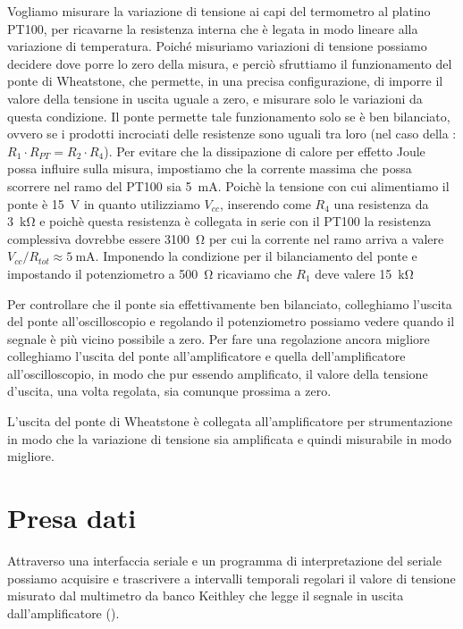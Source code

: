 \documentclass[
    rmp,
    reprint, 
    superscriptaddress, 
    altaffilletter, 
    amsmath, 
    amssymb,
    a4paper]{revtex4-2}
\begin{document}
Vogliamo misurare la variazione di tensione ai capi del termometro al platino PT100, per ricavarne la resistenza interna che è legata in modo lineare alla variazione di temperatura. Poiché misuriamo variazioni di tensione possiamo decidere dove porre lo zero della misura, e perciò sfruttiamo il funzionamento del ponte di Wheatstone, che permette, in una precisa configurazione, di imporre il valore della tensione in uscita uguale a zero, e misurare solo le variazioni da questa condizione. Il ponte permette tale funzionamento solo se è ben bilanciato, ovvero se i prodotti incrociati delle resistenze sono uguali tra loro (nel caso della : $R_1\cdot R_{PT}=R_2\cdot R_4$). Per evitare che la dissipazione di calore per effetto Joule possa influire sulla misura, impostiamo che la corrente massima che possa scorrere nel ramo del PT100 sia \SI{5}{\milli\ampere}. Poichè la tensione con cui alimentiamo il ponte è \SI{15}{\volt} in quanto utilizziamo $V_{cc}$, inserendo come $R_4$ una resistenza da \SI{3}{\kilo\ohm} e poichè questa resistenza è collegata in serie con il PT100 la resistenza complessiva dovrebbe essere \SI{3100}{\ohm} per cui la corrente nel ramo arriva a valere $V_{cc}/R_{tot}\approx\SI{5}{\milli\ampere}$. Imponendo la condizione per il bilanciamento del ponte e impostando il potenziometro a \SI{500}{\ohm} ricaviamo che $R_1$ deve valere \SI{15}{\kilo\ohm} 

Per controllare che il ponte sia effettivamente ben bilanciato, colleghiamo l'uscita del ponte all'oscilloscopio e regolando il potenziometro possiamo vedere quando il segnale è più vicino possibile a zero. Per fare una regolazione ancora migliore colleghiamo l'uscita del ponte all'amplificatore e quella dell'amplificatore all'oscilloscopio, in modo che pur essendo amplificato, il valore della tensione d'uscita, una volta regolata, sia comunque prossima a zero.

L'uscita del ponte di Wheatstone è collegata all'amplificatore per strumentazione in modo che la variazione di tensione sia amplificata e quindi misurabile in modo migliore. 


\section*{Presa dati}
Attraverso una interfaccia seriale e un programma di interpretazione del seriale possiamo acquisire e trascrivere a intervalli temporali regolari il valore di tensione misurato dal multimetro da banco Keithley che legge il segnale in uscita dall'amplificatore ().
\end{document}
